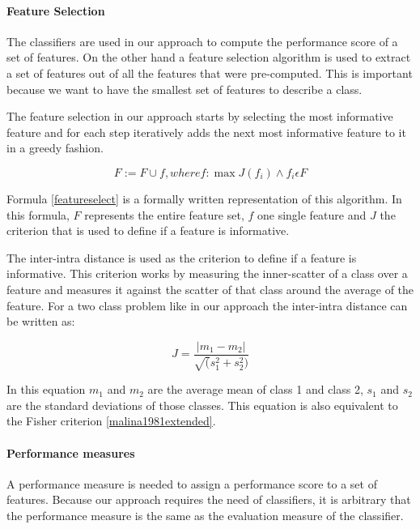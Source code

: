 \paragraph{Feature Selection}
The classifiers are used in our approach to compute the performance score of a set of features.
On the other hand a feature selection algorithm is used to extract a set of features out of all the features that were pre-computed.
This is important because we want to have the smallest set of features to describe a class.

The feature selection in our approach starts by selecting the most informative feature and for each step iteratively adds the next most informative feature to it in a greedy fashion.

\begin{equation}
\label{featureselect}
F := F \cup f, where f: \max{J(f_i)} \wedge f_i \epsilon F
\end{equation}

Formula \ref{featureselect} is a formally written representation of this algorithm.
In this formula, $F$ represents the entire feature set, $f$ one single feature and $J$ the criterion that is used to define if a feature is informative.

The inter-intra distance is used as the criterion to define if a feature is informative.
This criterion works by measuring the inner-scatter of a class over a feature and measures it against the scatter of that class around the average of the feature.
For a two class problem like in our approach the inter-intra distance can be written as:

\begin{equation}
\label{interintra}
J = \frac{|m_1-m_2|}{\sqrt(s^2_1 + s^2_2)}
\end{equation}

In this equation $m_1$ and $m_2$ are the average mean of class 1 and class 2, $s_1$ and $s_2$ are the standard deviations of those classes.
This equation is also equivalent to the Fisher criterion \ref{malina1981extended}.

\paragraph{Performance measures}
A performance measure is needed to assign a performance score to a set of features.
Because our approach requires the need of classifiers, it is arbitrary that the performance measure is the same as the evaluation measure of the classifier.


